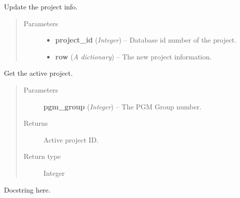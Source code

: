 \documentclass[letterpaper,10pt,english]{sphinxmanual}
\begin{document}

\begin{fulllineitems}
\label{controller:controller.project.edit_project}
Update the project info.
\begin{quote}\begin{description}
\item[{Parameters}] \leavevmode\begin{itemize}
\item {} 
\textbf{project\_id} (\emph{Integer}) -- Database id number of the project.

\item {} 
\textbf{row} (\emph{A dictionary}) -- The new project information.

\end{itemize}

\end{description}\end{quote}

\end{fulllineitems}


\begin{fulllineitems}
\label{controller:controller.project.get_active_project}
Get the active project.
\begin{quote}\begin{description}
\item[{Parameters}] \leavevmode
\textbf{pgm\_group} (\emph{Integer}) -- The PGM Group number.

\item[{Returns}] \leavevmode
Active project ID.

\item[{Return type}] \leavevmode
Integer

\end{description}\end{quote}

\end{fulllineitems}


\begin{fulllineitems}
\label{controller:controller.project.get_project_id_by_activity}
Docstring here.

\end{fulllineitems}
\end{document}
